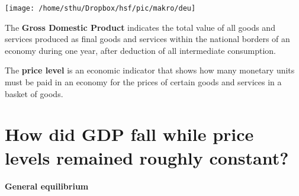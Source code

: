 
\begin{minipage}{0.6\textwidth}
\begin{center}
	\texttt{[image: /home/sthu/Dropbox/hsf/pic/makro/deu]}\label{fig:deu}
\end{center}
\end{minipage}
\begin{minipage}{0.4\textwidth}
The \textbf{Gross Domestic Product} indicates the total value of all goods and services produced as final goods and services within the national borders of an economy during one year, after deduction of all intermediate consumption.

The \textbf{price level} is an economic indicator that shows how many monetary units must be paid in an economy for the prices of certain goods and services in a basket of goods.  
\end{minipage}


\pbn
\section{How did GDP fall while price levels remained roughly constant?}


\paragraph{General equilibrium}

